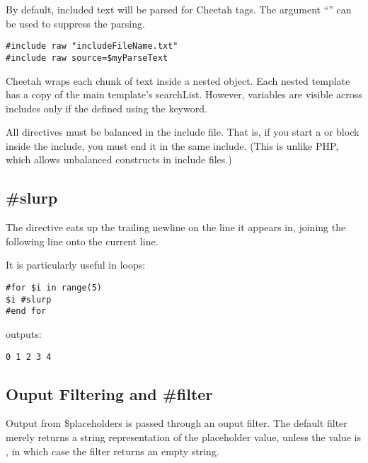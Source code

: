 By default, included text will be parsed for Cheetah tags.  The argument
``'' can be used to suppress the parsing.

\begin{verbatim}
#include raw "includeFileName.txt"
#include raw source=$myParseText
\end{verbatim}

Cheetah wraps each chunk of  text inside a nested
 object.  Each nested template has a copy of the main
template's searchList.  However,  variables are visible
across includes only if the defined using the  keyword.

All directives must be balanced in the include file.  That is, if you start
a  or  block inside the include, you must end it in
the same include.  (This is unlike PHP, which allows unbalanced constructs
in include files.)



\subsection{\#slurp}
\label{output.slurp}

The  directive eats up the trailing newline on the line it
appears in, joining the following line onto the current line.


It is particularly useful in  loops:
\begin{verbatim}
#for $i in range(5)
$i #slurp
#end for
\end{verbatim}
outputs:
\begin{verbatim}
0 1 2 3 4
\end{verbatim}


\subsection{Ouput Filtering and \#filter}
\label{output.filter}

Output from \$placeholders is passed through an ouput filter.  The default
filter merely returns a string representation of the placeholder value,
unless the value is , in which case the filter returns an empty
string. 

